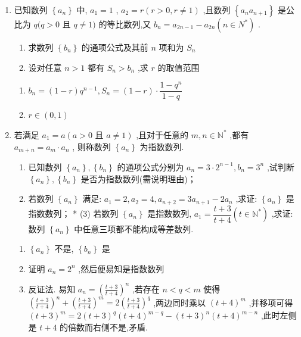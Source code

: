\begin{enumerate}
    \item 已知数列 $\left\{  {a}_{n}\right\}$ 中, ${a}_{1} = 1$ , ${a}_{2} = r\left( {r > 0,r \neq  1}\right)$ ,且数列 $\left\{  {{a}_{n}{a}_{n + 1}}\right\}$ 是公比为 $q(q > 0$ 且 $q \neq  1)$ 的等比数列,又 ${b}_{n} = {a}_{{2n} - 1} - {a}_{2n}\left( {n \in  {N}^{ * }}\right)$ .
    \begin{enumerate}
        \item 求数列 $\left\{  {b}_{n}\right\}$ 的通项公式及其前 $n$ 项和为 ${S}_{n}$ 
        \item 设对任意 $n > 1$ 都有 ${S}_{n} > {b}_{n}$ ,求 $r$ 的取值范围
    \end{enumerate}
    \begin{jieda}
        \begin{enumerate}
            \item $b_n = (1-r)q^{n-1}, S_n = (1-r) \cdot \dfrac{1-q^n}{1-q}$
            \item $r \in (0, 1)$
        \end{enumerate}
    \end{jieda}

     \item 若满足 ${a}_{1} = a\left( {a > 0\text{ 且 }a \neq  1}\right)$ ,且对于任意的 $m,n \in  {\mathbb{N}}^{ * }$ ,都有 ${a}_{m + n} = {a}_{m} \cdot  {a}_{n}$ , 则称数列 $\left\{  {a}_{n}\right\}$ 为指数数列.
    \begin{enumerate}
        \item 已知数列 $\left\{  {a}_{n}\right\}  ,\left\{  {b}_{n}\right\}$ 的通项公式分别为 ${a}_{n} = 3 \cdot  {2}^{n - 1},{b}_{n} = {3}^{n}$ ,试判断 $\left\{  {a}_{n}\right\}  ,\left\{  {b}_{n}\right\}$ 是否为指数数列(需说明理由)；
        \item 若数列 $\left\{  {a}_{n}\right\}$ 满足: ${a}_{1} = 2,{a}_{2} = 4,{a}_{n + 2} = 3{a}_{n + 1} - 2{a}_{n}$ ,求证: $\left\{  {a}_{n}\right\}$ 是指数数列； * (3) 若数列 $\left\{  {a}_{n}\right\}$ 是指数数列, ${a}_{1} = \dfrac{t + 3}{t + 4}\left( {t \in  {\mathbb{N}}^{ * }}\right)$ ,求证: 数列 $\left\{  {a}_{n}\right\}$ 中任意三项都不能构成等差数列.
    \end{enumerate}
    \begin{jieda}
        \begin{enumerate}
        \item  $\left\{  {a}_{n}\right\}$ 不是, $\left\{  {b}_{n}\right\}$ 是
        \item 证明 ${a}_{n} = {2}^{n}$ ,然后便易知是指数数列
        \item 反证法. 易知 ${a}_{n} = {\left( \frac{t + 3}{t + 4}\right) }^{n}$ ,若存在 $n < q < m$ 使得 ${\left( \frac{t + 3}{t + 4}\right) }^{n} + {\left( \frac{t + 3}{t + 4}\right) }^{m} = 2{\left( \frac{t + 3}{t + 4}\right) }^{q}$ ,两边同时乘以 ${\left( t + 4\right) }^{m}$ ,并移项可得 ${\left( t + 3\right) }^{m} = 2{\left( t + 3\right) }^{q}{\left( t + 4\right) }^{m - q} - {\left( t + 3\right) }^{n}{\left( t + 4\right) }^{m - n}$ ,此时左侧是 $t + 4$ 的倍数而右侧不是,矛盾.


\end{enumerate}
\end{jieda}
\end{enumerate}
